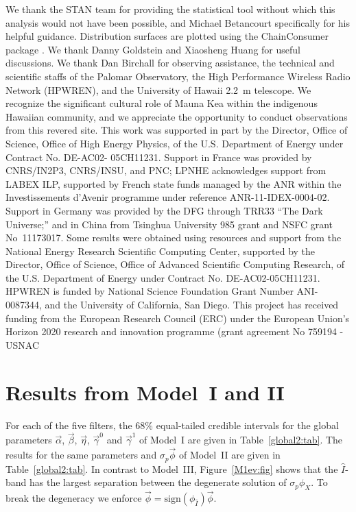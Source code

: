 \documentclass[trackchanges]{aastex62}   	%
\begin{document}
\acknowledgments
We thank the STAN team for providing the statistical tool without which this analysis would not have been possible,
and Michael Betancourt specifically for his helpful guidance.  
Distribution surfaces are plotted using the ChainConsumer package \citep{Hinton2016}.
We thank Danny Goldstein and
Xiaosheng Huang for useful discussions.
We thank Dan Birchall for observing assistance, the technical and
scientific staffs of the Palomar Observatory, the High Performance
Wireless Radio Network (HPWREN), and the University of Hawaii 2.2~m
telescope.  We recognize the significant cultural role of Mauna Kea
within the indigenous Hawaiian community, and we appreciate the
opportunity to conduct observations from this revered site.  This
work was supported in part by the Director, Office of Science,
Office of High Energy Physics, of the U.S. Department of Energy
under Contract No. DE-AC02- 05CH11231.  Support in France was
provided by CNRS/IN2P3, CNRS/INSU, and PNC; LPNHE acknowledges
support from LABEX ILP, supported by French state funds managed by
the ANR within the Investissements d'Avenir programme under reference
ANR-11-IDEX-0004-02.  Support in Germany was provided by the DFG
through TRR33 ``The Dark Universe;'' and in China from Tsinghua
University 985 grant and NSFC grant No~11173017.  Some results were
obtained using resources and support from the National Energy
Research Scientific Computing Center, supported by the Director,
Office of Science, Office of Advanced Scientific Computing Research,
of the U.S. Department of Energy under Contract No. DE-AC02-05CH11231.
HPWREN is funded by National Science Foundation Grant Number
ANI-0087344, and the University of California, San Diego.
This project has received funding from the European Research Council (ERC) under the European Union's Horizon 2020 research and innovation programme (grant agreement No 759194 - USNAC 

\appendix
\section{Results from Model~I and II}
\label{m12results:sec}
For each of the five filters, the 68\%  equal-tailed credible intervals for the global parameters $\vec{\alpha}$, $\vec{\beta}$, $\vec{\eta}$,
$\vec{\gamma}^0$ and $\vec{\gamma}^1$ of Model~I are given in  Table~\ref{global2:tab}.
The results for the same parameters and $\sigma_p\vec{\phi}$
of Model~II are given in Table~\ref{global2:tab}.  In contrast to Model~III,
Figure~\ref{M1ev:fig} shows that the $\hat{I}$-band has
the largest separation between the degenerate solution of $\sigma_p \phi_X$.  To break the degeneracy we enforce 
$\vec{\phi} = \text{sign}(\phi_{\hat{I}}) \vec{\phi}$.
\end{document}
